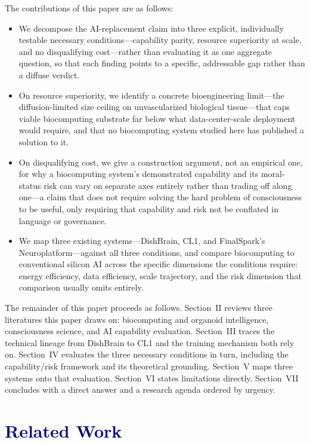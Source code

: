 \documentclass[journal]{IEEEtran}
\begin{document}
The contributions of this paper are as follows:
\begin{itemize}
\item We decompose the AI-replacement claim into three explicit, individually
testable necessary conditions---capability parity, resource superiority at scale,
and no disqualifying cost---rather than evaluating it as one aggregate question, so
that each finding points to a specific, addressable gap rather than a diffuse verdict.
\item On resource superiority, we identify a concrete bioengineering limit---the
diffusion-limited size ceiling on unvascularized biological
tissue---that caps viable biocomputing substrate far below what data-center-scale
deployment would require, and that no biocomputing system studied here has
published a solution to it.
\item On disqualifying cost, we give a construction argument, not an empirical one,
for why a biocomputing system's demonstrated capability and its moral-status risk can
vary on separate axes entirely rather than trading off along one---a claim
that does not require solving the hard problem of consciousness to be useful, only
requiring that capability and risk not be conflated in language or governance.
\item We map three existing systems---DishBrain, CL1, and FinalSpark's
Neuroplatform---against all three conditions, and compare biocomputing to
conventional silicon AI across the specific dimensions the conditions require:
energy efficiency, data efficiency, scale trajectory, and the risk dimension that
comparison usually omits entirely.
\end{itemize}

The remainder of this paper proceeds as follows. Section~II reviews three
literatures this paper draws on: biocomputing and organoid intelligence,
consciousness science, and AI capability evaluation. Section~III traces the
technical lineage from DishBrain to CL1 and the training mechanism both rely on.
Section~IV evaluates the three necessary conditions in turn, including the
capability/risk framework and its theoretical grounding. Section~V maps three
systems onto that evaluation. Section~VI states limitations directly. Section~VII
concludes with a direct answer and a research agenda ordered by urgency.

\section{\textcolor{darkblue}{Related Work}}
\end{document}
